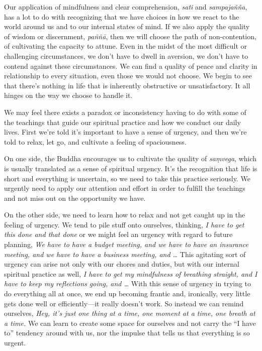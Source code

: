 Our application of mindfulness and clear comprehension, \emph{sati} and 
\emph{sampajañña}, has a lot to do with recognizing that we have 
choices in how we react to the world around us and to our internal 
states of mind. If we also apply the quality of wisdom or discernment, 
\emph{paññā}, then we will choose the path of non-contention, of 
cultivating the capacity to attune. Even in the midst of the most 
difficult or challenging circumstances, we don't have to dwell in 
aversion, we don't have to contend against these circumstances. We can 
find a quality of peace and clarity in relationship to every situation, 
even those we would not choose. We begin to see that there's nothing in 
life that is inherently obstructive or unsatisfactory. It all hinges on 
the way we choose to handle it.


We may feel there exists a paradox or inconsistency having to do with 
some of the teachings that guide our spiritual practice and how we 
conduct our daily lives. First we're told it's important to have a 
sense of urgency, and then we're told to relax, let go, and cultivate a 
feeling of spaciousness.

On one side, the Buddha encourages us to cultivate the quality of 
\emph{saṃvega}, which is usually translated as a sense of spiritual 
urgency. It's the recognition that life is short and everything is 
uncertain, so we need to take this practice seriously. We urgently need 
to apply our attention and effort in order to fulfill the teachings and 
not miss out on the opportunity we have.

On the other side, we need to learn how to relax and not get caught up 
in the feeling of urgency. We tend to pile stuff onto ourselves, 
thinking, \emph{I have to get this done and that done} or we might feel 
an urgency with regard to future planning, \emph{We have to have a 
budget meeting, and we have to have an insurance meeting, and we have 
to have a business meeting, and \ldots{}} This agitating sort of 
urgency can arise not only with our chores and duties, but with our 
internal spiritual practice as well, \emph{I have to get my mindfulness 
of breathing straight, and I have to keep my reflections going, and 
\ldots{}} With this sense of urgency in trying to do everything all at 
once, we end up becoming frantic and, ironically, very little gets done 
well or efficiently---it really doesn't work. So instead we can remind 
ourselves, \emph{Hey, it's just one thing at a time, one moment at a 
time, one breath at a time.} We can learn to create some space for 
ourselves and not carry the ``I have to'' tendency around with us, nor 
the impulse that tells us that everything is so urgent.

